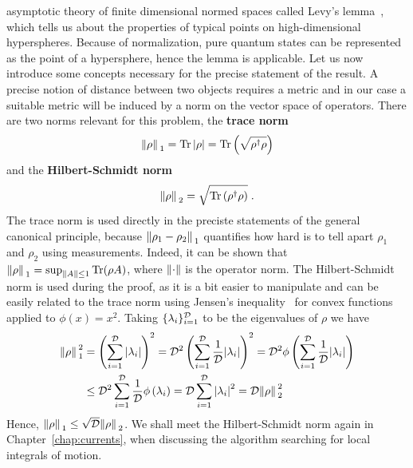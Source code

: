 asymptotic theory of finite dimensional normed spaces called Levy's lemma~\autocite{VitaliD.Milman1986}, which
tells us about the properties of typical points on high-dimensional hyperspheres. Because of normalization, pure quantum states
can be represented as the point of a hypersphere, hence the lemma is applicable.
Let us now
introduce some concepts necessary for the precise statement of the result. A precise notion of distance between two objects requires a metric and in
our case a suitable metric will be induced by a norm on the vector space of operators. There are two norms relevant
for this problem, the \textbf{trace norm}
\begin{equation}
	\norm*{\rho}_1 = \Tr\abs{\rho} = \Tr\left(\sqrt{\rho^{\dagger}\rho}\right)
\end{equation}
and the \textbf{Hilbert-Schmidt norm}
\begin{equation}
	\norm*{\rho}_2 = \sqrt{\Tr\left(\rho^{\dagger}\rho\right)}\;.
\end{equation}
The trace norm is used directly in the preciste statements of the general canonical principle, because
\(\norm*{\rho_1 - \rho_2}_1\) quantifies how hard is to tell apart \(\rho_1\) and \(\rho_2\) using measurements.
Indeed, it can be shown that \(\norm*{\rho}_1 = \mathrm{sup}_{\norm{A}\leq 1} \Tr(\rho A)\), where \(\norm{\cdot}\) is the operator norm.
The Hilbert-Schmidt norm is used during the proof, as it is a bit easier to manipulate and can be easily related to the
trace norm using Jensen's inequality~\autocite{Jensen1906} for convex functions applied to \(\phi(x) = x^2\). Taking \(\{\lambda_i\}_{i=1}^{\mathcal{D}}\) to be
the eigenvalues of \(\rho\) we have
\begin{align}
	\norm*{\rho}_1^2 & = \left(\sum_{i=1}^{\mathcal{D}}\abs{\lambda_i}\right)^2 = \mathcal{D}^2  \left(\sum_{i=1}^{\mathcal{D}}\frac{1}{\mathcal{D}}\abs{\lambda_i}\right)^2
	= \mathcal{D}^2 \phi\left(\sum_{i=1}^{\mathcal{D}}\frac{1}{\mathcal{D}}\abs{\lambda_i}\right) \nonumber                                                                 \\
	                 & \leq  {\mathcal{D}}^2 \sum_{i=1}^{\mathcal{D}}\frac{1}{\mathcal{D}} \phi\left(\lambda_i\right)
	= \mathcal{D} \sum_{i=1}^{\mathcal{D}} \abs{\lambda_i}^2 = \mathcal{D} \norm*{\rho}_2^2
\end{align}
Hence, \(\norm*{\rho}_1 \leq \sqrt{\mathcal{D}}\norm*{\rho}_2\). We shall meet the Hilbert-Schmidt norm again in Chapter~\ref{chap:currents},
when discussing the algorithm searching for local integrals of motion.
